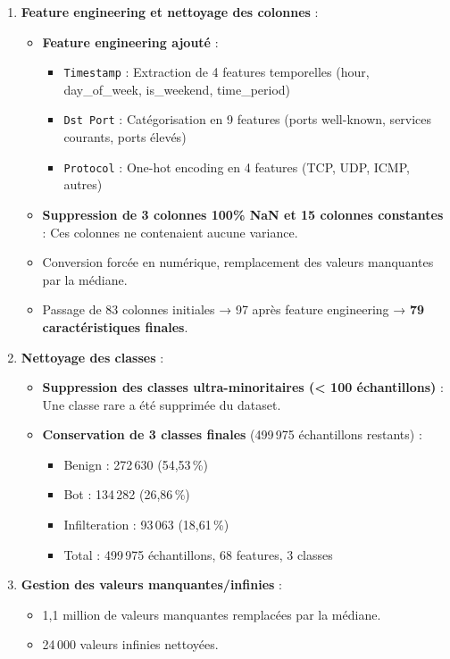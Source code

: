﻿\documentclass[11pt,a4paper]{article}
\begin{document}
\begin{enumerate}
    \item \textbf{Feature engineering et nettoyage des colonnes} :
    \begin{itemize}
        \item \textbf{Feature engineering ajouté} :
        \begin{itemize}
            \item \texttt{Timestamp} : Extraction de 4 features temporelles (hour, day\_of\_week, is\_weekend, time\_period)
            \item \texttt{Dst Port} : Catégorisation en 9 features (ports well-known, services courants, ports élevés)
            \item \texttt{Protocol} : One-hot encoding en 4 features (TCP, UDP, ICMP, autres)
    \end{itemize}
        \item \textbf{Suppression de 3 colonnes 100\% NaN et 15 colonnes constantes} : Ces colonnes ne contenaient aucune variance.
        \item Conversion forcée en numérique, remplacement des valeurs manquantes par la médiane.
        \item Passage de 83 colonnes initiales → 97 après feature engineering → \textbf{79 caractéristiques finales}.
    \end{itemize}
    
    \item \textbf{Nettoyage des classes} :
    \begin{itemize}
        \item \textbf{Suppression des classes ultra-minoritaires (< 100 échantillons)} : Une classe rare a été supprimée du dataset.
        \item \textbf{Conservation de 3 classes finales} (499\,975 échantillons restants) :
        \begin{itemize}
            \item Benign : 272\,630 (54,53\,\%)
            \item Bot : 134\,282 (26,86\,\%)
            \item Infilteration : 93\,063 (18,61\,\%)
            \item Total : 499\,975 échantillons, 68 features, 3 classes
    \end{itemize}
    \end{itemize}
    
    \item \textbf{Gestion des valeurs manquantes/infinies} :
    \begin{itemize}
        \item 1,1 million de valeurs manquantes remplacées par la médiane.
        \item 24\,000 valeurs infinies nettoyées.
    \end{itemize}
    

\end{enumerate}
\end{document}
